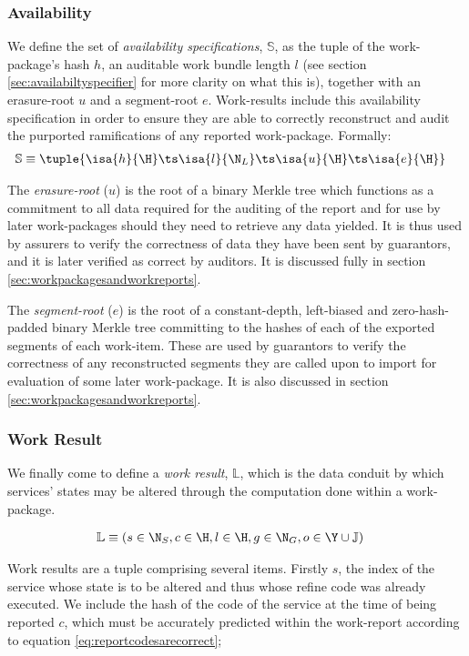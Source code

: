 \subsubsection{Availability}
We define the set of \emph{availability specifications}, $\mathbb{S}$, as the tuple of the work-package's hash $h$, an auditable work bundle length $l$ (see section \ref{sec:availabiltyspecifier} for more clarity on what this is), together with an erasure-root $u$ and a segment-root $e$. Work-results include this availability specification in order to ensure they are able to correctly reconstruct and audit the purported ramifications of any reported work-package. Formally:
\begin{align}
  \mathbb{S} &\equiv \tuple{
    \isa{h}{\H}\ts
    \isa{l}{\N_L}\ts
    \isa{u}{\H}\ts
    \isa{e}{\H}
  }
\end{align}

The \emph{erasure-root} ($u$) is the root of a binary Merkle tree which functions as a commitment to all data required for the auditing of the report and for use by later work-packages should they need to retrieve any data yielded. It is thus used by assurers to verify the correctness of data they have been sent by guarantors, and it is later verified as correct by auditors. It is discussed fully in section \ref{sec:workpackagesandworkreports}.

The \emph{segment-root} ($e$) is the root of a constant-depth, left-biased and zero-hash-padded binary Merkle tree committing to the hashes of each of the exported segments of each work-item. These are used by guarantors to verify the correctness of any reconstructed segments they are called upon to import for evaluation of some later work-package. It is also discussed in section \ref{sec:workpackagesandworkreports}.

\subsubsection{Work Result}
We finally come to define a \emph{work result}, $\mathbb{L}$, which is the data conduit by which services' states may be altered through the computation done within a work-package.

\begin{align}\label{eq:workresult}
  \mathbb{L} &\equiv (s \in \N_S, c \in \H, l \in \H, g \in \N_G, o \in \Y \cup \mathbb{J})
\end{align}

Work results are a tuple comprising several items. Firstly $s$, the index of the service whose state is to be altered and thus whose refine code was already executed. We include the hash of the code of the service at the time of being reported $c$, which must be accurately predicted within the work-report according to equation \ref{eq:reportcodesarecorrect};

